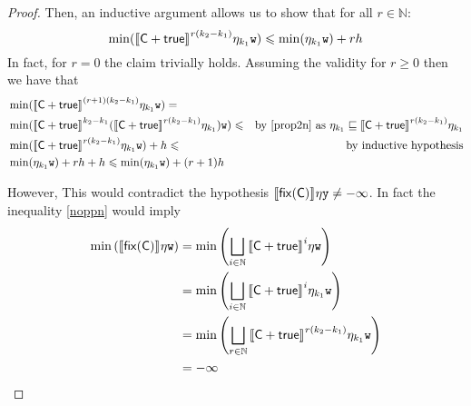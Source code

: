\begin{proof}
  \noindent    
  Then, an inductive argument allows us to show that for all \(r \in \mathbb{N}\):
  \begin{equation}\label{noppn}
    \min(\semi{\com \ndet \tru}^{r(k_2-k_1)} \eta_{k_1} \var[w]) \leq \min(\eta_{k_1}
    \var[w]) + r h
  \end{equation}  
  In fact, for \(r=0\) the claim trivially holds. Assuming the
  validity for \(r\geq 0\) then we have that
  \begin{align*}    
    & \min(\semi{\com \ndet \tru}^{(r+1)(k_2-k_1)} \eta_{k_1} \var[w]) =\\
    &\min(\semi{\com \ndet \tru}^{k_2-k_1} ( \semi{\com \ndet \tru}^{r(k_2-k_1)} \eta_{k_1}) \var[w]) \leq & \mbox{by \eqref{prop2n} as }\eta_{k_1} \sqsubseteq \semi{\com \ndet \tru}^{r(k_2-k_1)} \eta_{k_1}\\
    &\min(\semi{\com \ndet \tru}^{r(k_2-k_1)} \eta_{k_1} \var[w]) + h \leq & \mbox{by inductive hypothesis}\\
    &  \min(\eta_{k_1}\var[w])  + rh + h
      \leq 
      \min(\eta_{k_1}\var[w])  + (r+1)h
  \end{align*}

  \noindent
  However, This would contradict the hypothesis
  \(\semi{\fix{\com}} \eta \var[y] \neq -\infty\). In fact the
  inequality \eqref{noppn} would imply
  \begin{align*}
    \min\left(\semi{\fix{\com}} \eta \var[w]\right)
    & = \min\left(\bigsqcup_{i \in \mathbb{N}} \semi{\com
      \ndet \tru}^i \eta \var[w]\right)\\ 
    & = \min\left(\bigsqcup_{i \in \mathbb{N}} \semi{\com \ndet
      \tru}^i \eta_{k_1} \var[w]\right) \\ 
    & = \min\left(\bigsqcup_{r \in \mathbb{N}} \semi{\com \ndet
      \tru}^{r\left(k_2-k_1\right)} \eta_{k_1} \var[w]\right)\\
    & = -\infty
  \end{align*}


\end{proof}
